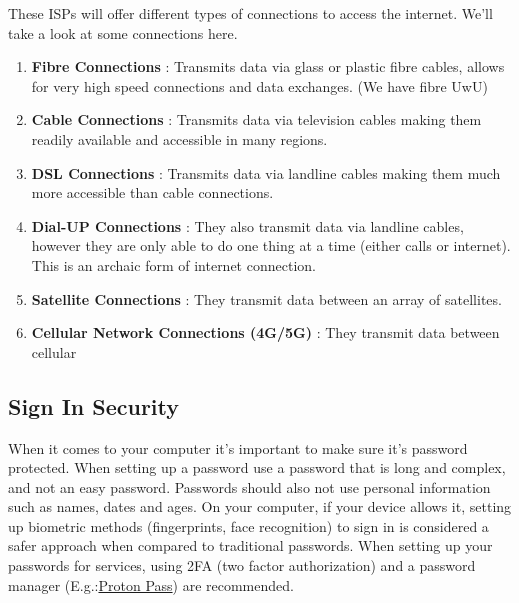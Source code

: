 \documentclass[11pt]{article}
\begin{document}
These ISPs will offer different types of connections to access the internet. We'll take a look at
some connections here.
\begin{enumerate}
\item \textbf{Fibre Connections} : Transmits data via glass or plastic fibre cables, allows for very high speed
connections and data exchanges. (We have fibre UwU)
\item \textbf{Cable Connections} : Transmits data via television cables making them readily available and
accessible in many regions.
\item \textbf{DSL Connections} : Transmits data via landline cables making them much more accessible than
cable connections.
\item \textbf{Dial-UP Connections} : They also transmit data via landline cables, however they are only able
to do one thing at a time (either calls or internet). This is an archaic form of internet
connection.
\item \textbf{Satellite Connections} : They transmit data between an array of satellites.
\item \textbf{Cellular Network Connections (4G/5G)} : They transmit data between cellular
\end{enumerate}
\subsection{Sign In Security}
\label{sec:org2aa19fc}
When it comes to your computer it's important to make sure it's password protected. When setting up
a password use a password that is long and complex, and not an easy password. Passwords should also
not use personal information such as names, dates and ages. On your computer, if your device allows
it, setting up biometric methods (fingerprints, face recognition) to sign in is considered a safer
approach when compared to traditional passwords.
When setting up your passwords for services, using 2FA (two factor authorization) and a password
manager (E.g.:\href{https://proton.me/pass}{Proton Pass}) are recommended.
\end{document}
